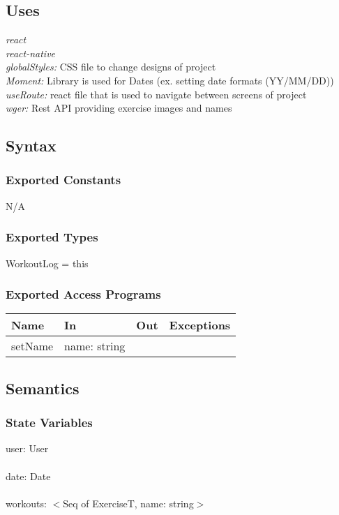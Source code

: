 \documentclass[12pt, titlepage]{article}
\begin{document}
\subsection{Uses}
{\textit{react}}\\
{\textit{react-native}}\\
{\textit{globalStyles:} CSS file to change designs of project}\\
{\textit{Moment:} Library is used for Dates (ex. setting date formats (YY/MM/DD))}\\
{\textit{useRoute:} react file that is used to navigate between screens of project}\\
{\textit{wger:} Rest API providing exercise images and names}\\

\subsection{Syntax}

\subsubsection{Exported Constants}
N/A

\subsubsection{Exported Types}
WorkoutLog = this

\subsubsection{Exported Access Programs}

\begin{tabular}{| l | l | l | l |}
	\hline
	{\textbf{Name}} & {\textbf{In}} & {\textbf{Out}} & {\textbf{Exceptions}}\\
	\hline
	{setName} & name: string & & \\
	\hline
\end{tabular}

\subsection{Semantics}

\subsubsection{State Variables}

user: User\\\\
date: Date\\\\
workouts: $<$Seq of ExerciseT, name: string$>$
\end{document}
